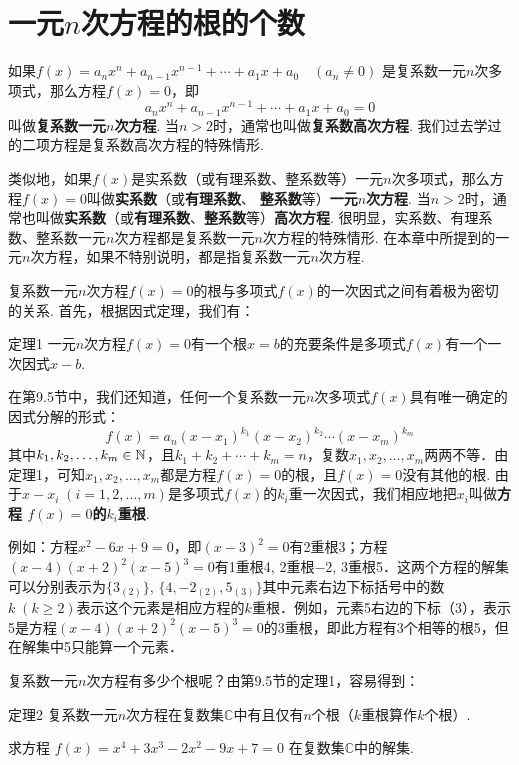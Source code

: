 \section{一元$n$次方程的根的个数}
如果$f(x)=a_nx^n+a_{n-1}x^{n-1}+\cdots+a_1x+a_0\quad (a_n\ne 0)$
是复系数一元$n$次多项式，那么方程$f(x)=0$，即
\[a_nx^n+a_{n-1}x^{n-1}+\cdots+a_1x+a_0=0\]
叫做\textbf{复系数一元$n$次方程}. 当$n>2$时，通常也叫做\textbf{复系数高次方程}. 我们过去学过的二项方程是复系数高次方程的特殊情形.

类似地，如果$f(x)$是实系数（或有理系数、整系数等）一元$n$次多项式，那么方程$f(x)=0$叫做\textbf{实系数}（或\textbf{有理系数}、
\textbf{整系数}等）\textbf{一元$n$次方程}. 当$n>2$时，通常也叫做\textbf{实系数}（或\textbf{有理系数}、\textbf{整系数}等）\textbf{高次方程}. 很明显，实系数、有理系数、整系数一元$n$次方程都是复系数一元$n$次方程的特殊情形. 在本章中所提到的一元$n$次方程，如果不特别说明，都是指复系数一元$n$次方程.

复系数一元$n$次方程$f(x)=0$的根与多项式$f(x)$的一次因式之间有着极为密切的关系. 首先，根据因式定理，我们有：

\begin{thm}
    {定理1} 一元$n$次方程$f(x)=0$有一个根$x=b$的充要条件是多项式$f(x)$有一个一次因式$x-b$.
\end{thm}

在第9.5节中，我们还知道，任何一个复系数一元$n$次多项式$f(x)$具有唯一确定的因式分解的形式：
\[f(x)=a_n(x-x_1)^{k_1}(x-x_2)^{k_2}\cdots (x-x_m)^{k_m}\]
其中$k_1,k_2,\ldots,k_m\in\mathbb{N}$，且$k_1+k_2+\cdots +k_m=n$，复数$x_1,x_2,\ldots,x_m$两两不等．由定理1，可知$x_1,x_2,\ldots,x_m$都是方程$f(x)=0$的根，且$f(x)=0$没有其他的根. 由于$x-x_i\; (i=1,2,\ldots,m)$是多项式$f(x)$的$k_i$重一次因式，我们相应地把$x_i$叫做\textbf{方程
$f(x)=0$的$k_i$重根}.

例如：方程$x^2-6x+9=0$，即$(x-3)^2=0$有2重根3；方程$(x-4)(x+2)^2(x-5)^3=0$有1重根4, 2重根$-2$, 3重根5．这两个方程的解集可以分别表示为$\{3_{(2)}\}$, $\{4,-2_{(2)},5_{(3)}\}$其中元素右边下标括号中的数$k\;(k\ge 2)$表示这个元素是相应方程的$k$重根．例如，元素5右边的下标（3），表示5是方程$(x-4)(x+2)^2(x-5)^3=0$的3重根，即此方程有3个相等的根5，但在解集中5只能算一个元素．

复系数一元$n$次方程有多少个根呢？由第9.5节的定理1，容易得到：

\begin{thm}
{定理2} 复系数一元$n$次方程在复数集$\mathbb{C}$中有且仅有$n$个根（$k$重根算作$k$个根）.    
\end{thm}

\begin{example}
    求方程
$f(x)=x^4+3x^3-2x^2-9x+7=0$
在复数集$\mathbb{C}$中的解集.
\end{example}

